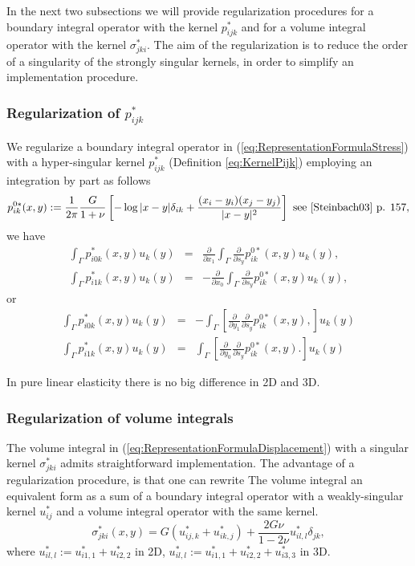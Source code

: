 In the next two subsections we will provide  regularization procedures for a boundary integral operator with the kernel $p^{*}_{ijk}$ and for a volume integral operator with the kernel $\sigma^{*}_{jki}$. The aim of the regularization is to reduce the order of a singularity of the strongly singular kernels, in order to simplify an implementation procedure.
\subsubsection{Regularization of $p^{*}_{ijk}$}
We regularize a boundary integral operator in (\ref{eq:RepresentationFormulaStress}) with a hyper-singular kernel $p^{*}_{ijk}$ (Definition
\ref{eq:KernelPijk}) employing an integration by part as follows
\begin{equation}\nonumber
p^{0*}_{ik}(x,y):= \frac{1}{2\pi}\frac{G}{1+\nu}\left[-\log|x-y|\delta_{ik}+\frac{(x_i-y_i)(x_j-y_j)}{|x-y|^2}\right]\mbox{ see \cite{Steinbach03} p. 157},
\end{equation}
we have
\begin{eqnarray}
\int_{\Gamma}p^{*}_{i0k}(x,y)u_k(y)& =& \frac{\partial}{\partial x_1} \int_{\Gamma}\frac{\partial}{\partial s_y}p^{0*}_{ik}(x,y) u_k(y), \nonumber \\
\int_{\Gamma}p^{*}_{i1k}(x,y)u_k(y)& =& -\frac{\partial}{\partial x_0} \int_{\Gamma}\frac{\partial}{\partial s_y}p^{0*}_{ik}(x,y)u_k(y), \nonumber 
\end{eqnarray}
or
\begin{eqnarray}
\int_{\Gamma}p^{*}_{i0k}(x,y)u_k(y)& =& - \int_{\Gamma}\left[\frac{\partial}{\partial y_1}\frac{\partial}{\partial s_y}p^{0*}_{ik}(x,y),\right]u_k(y) \nonumber \\
\int_{\Gamma}p^{*}_{i1k}(x,y)u_k(y)& =&  \int_{\Gamma}\left[\frac{\partial}{\partial y_0}\frac{\partial}{\partial s_y}p^{0*}_{ik}(x,y).\right]u_k(y) \nonumber 
\end{eqnarray}


\begin{remark}
In pure linear elasticity  there is no big difference in 2D and 3D. 
\end{remark}

\subsubsection{Regularization of volume integrals}
The volume integral in (\ref{eq:RepresentationFormulaDisplacement}) with a singular kernel $\sigma^{*}_{jki}$ admits straightforward implementation. The advantage of a regularization procedure, is that one can rewrite The volume integral an equivalent form as a sum of a boundary integral operator with a weakly-singular  kernel $u^{*}_{ij}$ and a volume integral operator with the same kernel.
\[
\sigma^{*}_{jki}(x,y)=G\left(u^{*}_{ij,k}+u^{*}_{ik,j}\right)+\frac{2G\nu}{1-2\nu}u^{*}_{il,l}\delta_{jk},
\]
where $u^{*}_{il,l}:=u^{*}_{i1,1}+u^{*}_{i2,2}$ in 2D, $u^{*}_{il,l}:=u^{*}_{i1,1}+u^{*}_{i2,2}+u^{*}_{i3,3}$ in 3D.

